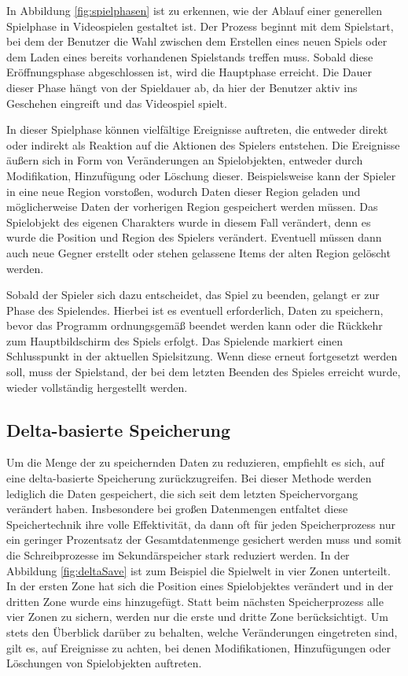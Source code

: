 In Abbildung \ref{fig:spielphasen} ist zu erkennen, wie der Ablauf einer generellen Spielphase in Videospielen gestaltet ist. Der Prozess beginnt mit dem Spielstart, bei dem der Benutzer die Wahl zwischen dem Erstellen eines neuen Spiels oder dem Laden eines bereits vorhandenen Spielstands treffen muss. Sobald diese Eröffnungsphase abgeschlossen ist, wird die Hauptphase erreicht. Die Dauer dieser Phase hängt von der Spieldauer ab, da hier der Benutzer aktiv ins Geschehen eingreift und das Videospiel spielt.

In dieser Spielphase können vielfältige Ereignisse auftreten, die entweder direkt oder indirekt als Reaktion auf die Aktionen des Spielers entstehen. Die Ereignisse äußern sich in Form von Veränderungen an Spielobjekten, entweder durch Modifikation, Hinzufügung oder Löschung dieser. Beispielsweise kann der Spieler in eine neue Region vorstoßen, wodurch Daten dieser Region geladen und möglicherweise Daten der vorherigen Region gespeichert werden müssen. Das Spielobjekt des eigenen Charakters wurde in diesem Fall verändert, denn es wurde die Position und Region des Spielers verändert. Eventuell müssen dann auch neue Gegner erstellt oder stehen gelassene Items der alten Region gelöscht werden. 

Sobald der Spieler sich dazu entscheidet, das Spiel zu beenden, gelangt er zur Phase des Spielendes. Hierbei ist es eventuell erforderlich, Daten zu speichern, bevor das Programm ordnungsgemäß beendet werden kann oder die Rückkehr zum Hauptbildschirm des Spiels erfolgt. Das Spielende markiert einen Schlusspunkt in der aktuellen Spielsitzung. Wenn diese erneut fortgesetzt werden soll, muss der Spielstand, der bei dem letzten Beenden des Spieles erreicht wurde, wieder vollständig hergestellt werden. 


\subsection{Delta-basierte Speicherung} \label{ssect:deltasave}
Um die Menge der zu speichernden Daten zu reduzieren, empfiehlt es sich, auf eine delta-basierte Speicherung zurückzugreifen. Bei dieser Methode werden lediglich die Daten gespeichert, die sich seit dem letzten Speichervorgang verändert haben. Insbesondere bei großen Datenmengen entfaltet diese Speichertechnik ihre volle Effektivität, da dann oft für jeden Speicherprozess nur ein geringer Prozentsatz der Gesamtdatenmenge gesichert werden muss und somit die Schreibprozesse im Sekundärspeicher stark reduziert werden. In der Abbildung \ref{fig:deltaSave} ist zum Beispiel die Spielwelt in vier Zonen unterteilt. In der ersten Zone hat sich die Position eines Spielobjektes verändert und in der dritten Zone wurde eins hinzugefügt. Statt beim nächsten Speicherprozess alle vier Zonen zu sichern, werden nur die erste und dritte Zone berücksichtigt. Um stets den Überblick darüber zu behalten, welche Veränderungen eingetreten sind, gilt es, auf Ereignisse zu achten, bei denen Modifikationen, Hinzufügungen oder Löschungen von Spielobjekten auftreten.

